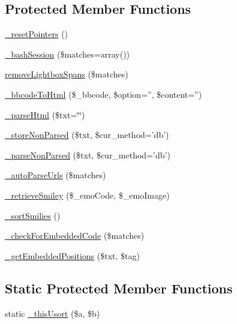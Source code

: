 \subsection*{Protected Member Functions}
\begin{DoxyCompactItemize}
\item 
\hyperlink{classclass__bbcode__core_a30545653920382c47dfe48bc5317b5ed}{\-\_\-reset\-Pointers} ()
\item 
\hyperlink{classclass__bbcode__core_a6c1e0b248c05cf3f5d1bab31e90d4b72}{\-\_\-bash\-Session} (\$matches=array())
\item 
\hyperlink{classclass__bbcode__core_a2b6830013ef023c94df94e8a1d4b79e1}{remove\-Lightbox\-Spans} (\$matches)
\item 
\hyperlink{classclass__bbcode__core_af3f973c17c9f1a83a126d3c6ed61df01}{\-\_\-bbcode\-To\-Html} (\$\-\_\-bbcode, \$option='', \$content='')
\item 
\hyperlink{classclass__bbcode__core_acc9c3f49b1e5346c6d184baf8af4ebc3}{\-\_\-parse\-Html} (\$txt=\char`\"{}\char`\"{})
\item 
\hyperlink{classclass__bbcode__core_a7ca561caf17196f29ac05ea894a98281}{\-\_\-store\-Non\-Parsed} (\$txt, \$cur\-\_\-method='db')
\item 
\hyperlink{classclass__bbcode__core_ae4400a9b7144cf7c8ef01d801d0d8a3e}{\-\_\-parse\-Non\-Parsed} (\$txt, \$cur\-\_\-method='db')
\item 
\hyperlink{classclass__bbcode__core_a10f5c5713f0a8ec8856e09de5f6d46f1}{\-\_\-auto\-Parse\-Urls} (\$matches)
\item 
\hyperlink{classclass__bbcode__core_a74f3b1858d91b3b6f0bf4bc17c4aafbb}{\-\_\-retrieve\-Smiley} (\$\-\_\-emo\-Code, \$\-\_\-emo\-Image)
\item 
\hyperlink{classclass__bbcode__core_ab875bfd7c4a1437f7b972735d87affdb}{\-\_\-sort\-Smilies} ()
\item 
\hyperlink{classclass__bbcode__core_a77bbb51e2b0daf75170982d58d3a8b41}{\-\_\-check\-For\-Embedded\-Code} (\$matches)
\item 
\hyperlink{classclass__bbcode__core_a3080e333c96958c5061014890b2f5867}{\-\_\-get\-Embedded\-Positions} (\$txt, \$tag)
\end{DoxyCompactItemize}
\subsection*{Static Protected Member Functions}
\begin{DoxyCompactItemize}
\item 
static \hyperlink{classclass__bbcode__core_ab1192aa3289f02bfed172c3f3d9e9df8}{\-\_\-this\-Usort} (\$a, \$b)
\end{DoxyCompactItemize}
